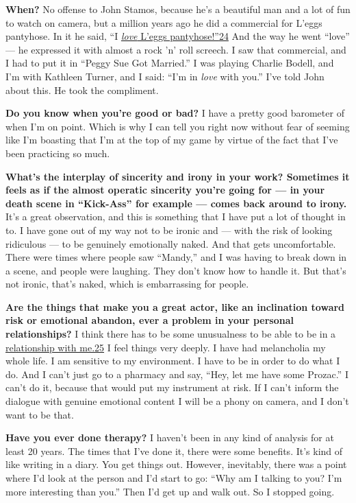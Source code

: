 \textbf{When?} No offense to John Stamos, because he's a beautiful man
and a lot of fun to watch on camera, but a million years ago he did a
commercial for L'eggs pantyhose. In it he said, ``I
\href{http://nytimes3xbfgragh.onion\#tooltip-24}{\emph{love} L'eggs
pantyhose!''}\href{http://nytimes3xbfgragh.onion\#tooltip-24}{24} And
the way he went ``love'' --- he expressed it with almost a rock 'n' roll
screech. I saw that commercial, and I had to put it in ``Peggy Sue Got
Married.'' I was playing Charlie Bodell, and I'm with Kathleen Turner,
and I said: ``I'm in \emph{love} with you.'' I've told John about this.
He took the compliment.

\textbf{Do you know when you're good or bad?} I have a pretty good
barometer of when I'm on point. Which is why I can tell you right now
without fear of seeming like I'm boasting that I'm at the top of my game
by virtue of the fact that I've been practicing so much.

\textbf{What's the interplay of sincerity and irony in your work?
Sometimes it feels as if the almost operatic sincerity you're going for
--- in your death scene in ``Kick-Ass'' for example --- comes back
around to irony.} It's a great observation, and this is something that I
have put a lot of thought in to. I have gone out of my way not to be
ironic and --- with the risk of looking ridiculous --- to be genuinely
emotionally naked. And that gets uncomfortable. There were times where
people saw ``Mandy,'' and I was having to break down in a scene, and
people were laughing. They don't know how to handle it. But that's not
ironic, that's naked, which is embarrassing for people.

\textbf{Are the things that make you a great actor, like an inclination
toward risk or emotional abandon, ever a problem in your personal
relationships?} I think there has to be some unusualness to be able to
be in a \href{http://nytimes3xbfgragh.onion\#tooltip-25}{relationship
with me.}\href{http://nytimes3xbfgragh.onion\#tooltip-25}{25} I feel
things very deeply. I have had melancholia my whole life. I am sensitive
to my environment. I have to be in order to do what I do. And I can't
just go to a pharmacy and say, ``Hey, let me have some Prozac.'' I can't
do it, because that would put my instrument at risk. If I can't inform
the dialogue with genuine emotional content I will be a phony on camera,
and I don't want to be that.

\textbf{Have you ever done therapy?} I haven't been in any kind of
analysis for at least 20 years. The times that I've done it, there were
some benefits. It's kind of like writing in a diary. You get things out.
However, inevitably, there was a point where I'd look at the person and
I'd start to go: ``Why am I talking to you? I'm more interesting than
you.'' Then I'd get up and walk out. So I stopped going.

